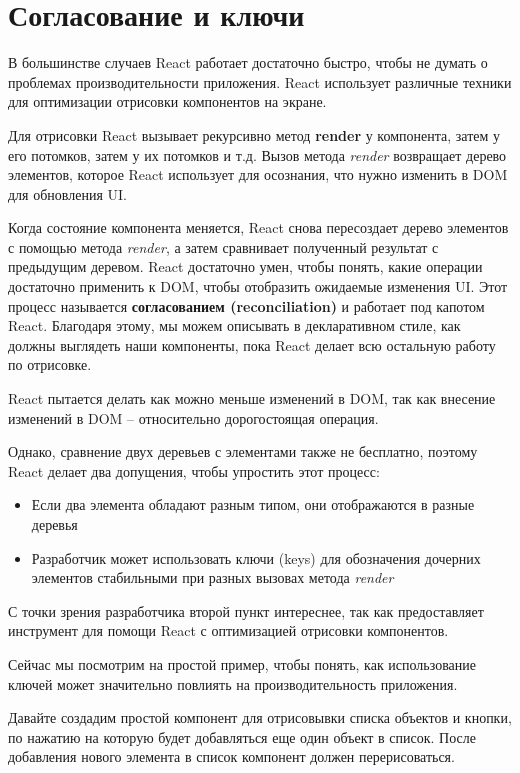 \section{Согласование и ключи}

В большинстве случаев React работает достаточно быстро, чтобы не думать о проблемах производительности приложения. React использует различные техники для оптимизации отрисовки компонентов на экране.

Для отрисовки React вызывает рекурсивно метод \textbf{render} у компонента, затем у его потомков, затем у их потомков и т.д. Вызов метода \textit{render} возвращает дерево элементов, которое React использует для осознания, что нужно изменить в DOM для обновления UI.

Когда состояние компонента меняется, React снова пересоздает дерево элементов с помощью метода \textit{render}, а затем сравнивает полученный результат с предыдущим деревом. React достаточно умен, чтобы понять, какие операции достаточно применить к DOM, чтобы отобразить ожидаемые изменения UI. Этот процесс называется \textbf{согласованием (reconciliation)} и работает под капотом React. Благодаря этому, мы можем описывать в декларативном стиле, как должны выглядеть наши компоненты, пока React делает всю остальную работу по отрисовке.

React пытается делать как можно меньше изменений в DOM, так как внесение изменений в DOM -- относительно дорогостоящая операция.

Однако, сравнение двух деревьев с элементами также не бесплатно, поэтому React делает два допущения, чтобы упростить этот процесс:

\begin{itemize}
	\item Если два элемента обладают разным типом, они отображаются в разные деревья
	\item Разработчик может использовать ключи (keys) для обозначения дочерних элементов стабильными при разных вызовах метода \textit{render}
\end{itemize}  

С точки зрения разработчика второй пункт интереснее, так как предоставляет инструмент для помощи React с оптимизацией отрисовки компонентов.

Сейчас мы посмотрим на простой пример, чтобы понять, как использование ключей может значительно повлиять на производительность приложения.

Давайте создадим простой компонент для отрисовывки списка объектов и кнопки, по нажатию на которую будет добавляться еще один объект в список. После добавления нового элемента в список компонент должен перерисоваться.

